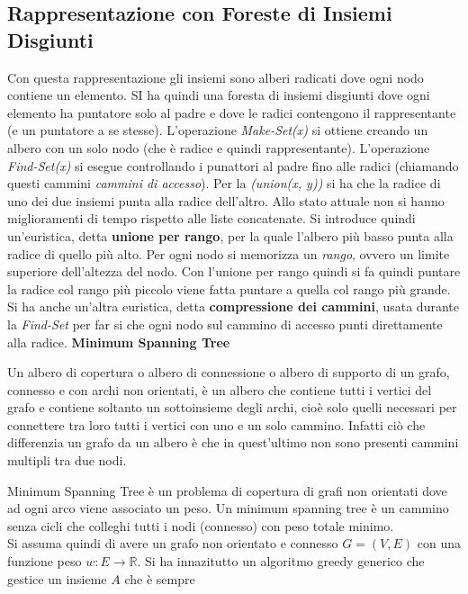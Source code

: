 \documentclass[a4paper,12pt, oneside]{book}
\begin{document}
\subsection{Rappresentazione con Foreste di Insiemi Disgiunti}
Con questa rappresentazione gli insiemi sono alberi radicati dove ogni
nodo contiene un elemento. SI ha quindi una foresta di insiemi
disgiunti dove ogni elemento ha puntatore solo al padre e dove le
radici contengono il rappresentante (e un puntatore a se
stesse). L'operazione \textit{Make-Set(x)} si ottiene creando un
albero con un solo nodo (che è radice e quindi
rappresentante). L'operazione \textit{Find-Set(x)} si esegue
controllando i punattori al padre fino alle radici (chiamando questi
cammini \textit{cammini di accesso}). Per la \textit{(union(x, y))} si
ha che la radice di uno dei due insiemi punta alla radice
dell'altro. Allo stato attuale non si hanno miglioramenti di tempo
rispetto alle liste concatenate. Si introduce quindi un'euristica,
detta \textbf{unione per rango}, per la quale l'albero più basso punta
alla radice di quello più alto. Per ogni nodo si memorizza un
\textit{rango}, ovvero un limite superiore dell'altezza del nodo. Con
l'unione per rango quindi si fa quindi puntare la radice col rango più
piccolo viene fatta puntare a quella col rango più grande. \\
Si ha anche un'altra euristica, detta \textbf{compressione dei
  cammini}, usata durante la \textit{Find-Set} per far si che ogni
nodo sul cammino di accesso punti direttamente alla radice.
\textbf{Minimum Spanning Tree}
\begin{definizione}
  Un albero di copertura o albero di connessione o albero di supporto
  di un grafo, connesso e con archi non orientati, è un albero che
  contiene tutti i vertici del grafo e contiene soltanto un
  sottoinsieme degli archi, cioè solo quelli necessari per connettere
  tra loro tutti i vertici con uno e un solo cammino. Infatti ciò che
  differenzia un grafo da un albero è che in quest'ultimo non sono
  presenti cammini multipli tra due nodi.
\end{definizione}
Minimum Spanning Tree è un problema di copertura di grafi non
orientati dove ad ogni arco viene associato un peso. Un minimum
spanning tree è un cammino senza cicli che colleghi tutti i nodi
(connesso) con peso totale minimo.\\
Si assuma quindi di avere un grafo non orientato e connesso $G=(V,E)$
con una funzione peso $w:E\to\mathbb{R}$. Si ha innazitutto un
algoritmo greedy generico che gestice un insieme $A$ che è sempre
\end{document}
